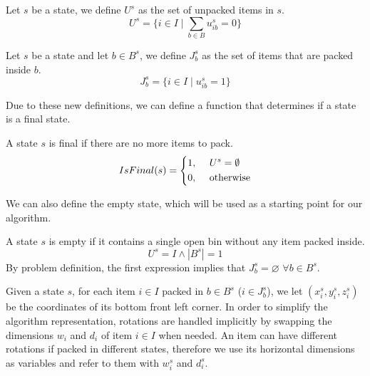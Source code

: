 \begin{definition}
    Let $s$ be a state, we define $U^s$ as the set of unpacked items in $s$.
    \begin{equation*}
        U^s = \{ i \in I \mid \sum_{b \in B} u^{s}_{ib} = 0 \}
    \end{equation*}
\end{definition}

\begin{definition}
    Let $s$ be a state and let $b \in B^s$, we define $J^s_b$ as the set of items that are packed inside $b$.
    \begin{equation*}
        J^s_b = \{ i \in I \mid u^{s}_{ib} = 1 \}
    \end{equation*}
\end{definition}

Due to these new definitions, we can define a function that determines if a state is a final state.
\begin{definition}
    \label{def:state_final}
    A state $s$ is final if there are no more items to pack.
    \begin{equation}
        \label{algo:state_final}%
        IsFinal(s) = \left\{\begin{aligned}
            1,\hspace{0.5cm}& U^s = \emptyset \\
            0,\hspace{0.5cm}& \text{otherwise}
        \end{aligned}
        \right.
    \end{equation}
\end{definition}

We can also define the empty state, which will be used as a starting point for our algorithm.
\begin{definition} \label{def:empty_state}
    A state $s$ is empty if it contains a single open bin without any item packed inside.
    \begin{equation*}
        U^s = I \wedge |B^s| = 1
    \end{equation*}
    By problem definition, the first expression implies that $J^s_b = \varnothing$ $\forall b \in B^s$.
\end{definition}

Given a state $s$, for each item $i \in I$ packed in $b \in B^s$ ($i \in J^s_b$), we let $(x^s_i, y^s_i, z^s_i)$ be the coordinates of its bottom front left corner. In order to simplify the algorithm representation, rotations are handled implicitly by swapping the dimensions $w_i$ and $d_i$ of item $i \in I$ when needed. An item can have different rotations if packed in different states, therefore we use its horizontal dimensions as variables and refer to them with $w^s_i$ and $d^s_i$.

